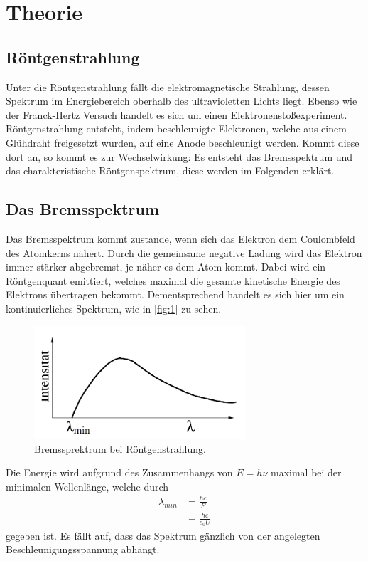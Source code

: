 \section{Theorie}
\label{sec:Theorie}

\subsection{Röntgenstrahlung}
Unter die Röntgenstrahlung fällt die elektromagnetische Strahlung, dessen 
Spektrum im Energiebereich oberhalb des ultravioletten Lichts liegt.
Ebenso wie der Franck-Hertz Versuch handelt es sich um einen Elektronenstoßexperiment.
Röntgenstrahlung entsteht, indem beschleunigte Elektronen, welche aus einem 
Glühdraht freigesetzt wurden, auf eine Anode beschleunigt werden. Kommt diese 
dort an, so kommt es zur Wechselwirkung: Es entsteht das Bremsspektrum und 
das charakteristische Röntgenspektrum, diese werden im Folgenden erklärt.

\subsection{Das Bremsspektrum}
Das Bremsspektrum kommt zustande, wenn sich das Elektron dem Coulombfeld des 
Atomkerns nähert. Durch die gemeinsame negative Ladung wird das Elektron 
immer stärker abgebremst, je näher es dem Atom kommt. Dabei wird ein Röntgenquant 
emittiert, welches maximal die gesamte kinetische Energie des Elektrons übertragen
bekommt. Dementsprechend handelt es sich hier um ein kontinuierliches Spektrum,
wie in \autoref{fig:1} zu sehen.
\begin{figure}[H]
    \centering
        \centering
        \includegraphics[width=0.7\textwidth]{bilder/brems.png}
        \caption{Bremssprektrum bei Röntgenstrahlung. \cite{anleitung10}}
    \hfill
    \label{fig:1}
\end{figure}
\noindent Die Energie wird aufgrund des Zusammenhangs von $E=h \nu$ maximal bei
der minimalen Wellenlänge, welche durch 
\begin{align}
    \lambda_{min} &= \frac{h c}{E} \\
                  &= \frac{h c}{e_0 U}
\end{align}
gegeben ist. Es fällt auf, dass das Spektrum gänzlich von der angelegten 
Beschleunigungsspannung abhängt.

